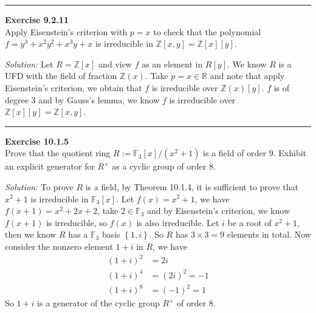 \documentclass[a4paper, 12pt]{article}
\newenvironment{problem}[2][Exercise]
    { \begin{mdframed}[backgroundcolor=gray!20] \textbf{#1 #2} \\}
    {  \end{mdframed}}
\newenvironment{solution}
    {\textit{Solution:}}
    {}
\begin{document}
\noindent\rule{7in}{2.8pt}
\begin{problem}{9.2.11}
Apply Eisenstein's criterion with \(p=x\) to check that the polynomial \(f=y^3+x^2y^2+x^3y+x\) is irreducible in \(\mathbb{Z}[x,y]=\mathbb{Z}[x][y]\).
\end{problem}
\begin{solution}
Let \(R=\mathbb{Z}[x]\) and view \(f\) as an element in \(R[y]\). We know \(R\) is a UFD with the field of fraction \(\mathbb{Z}(x)\). Take \(p=x\in \mathbb{R}\) and note that 
apply Eisenstein's criterion, we obtain that \(f\) is irreducible over \(\mathbb{Z}(x)[y]\). \(f\) is of degree 3 and by Gauss's lemma, we know \(f\) is irreducible over \(\mathbb{Z}[x][y]=\mathbb{Z}[x,y]\).
\end{solution}

\noindent\rule{7in}{2.8pt}
\begin{problem}{10.1.5}
Prove that the quotient ring \(R:=\mathbb{F}_3[x]/(x^2+1)\) is a field of order \(9\). Exhibit an explicit generator for \(R^\times\) as a cyclic group of order \(8\).
\end{problem}
\begin{solution}
To prove \(R\) is a field, by Theorem 10.1.4, it is sufficient to prove that \(x^2+1\) is irreducible in \(\mathbb{F}_3[x]\). Let \(f(x)=x^2+1\), we have 
\(f(x+1)=x^2+2x+2\), take \(2\in \mathbb{F}_3\) and by Eisenstein's criterion, we know \(f(x+1)\) is irreducible, so \(f(x)\) is also irreducible. Let \(i\) be a root of \(x^2+1\), then we know \(R\) has a 
\(\mathbb{F}_3\) basis \(\left\{ 1,i \right\}\). So \(R\) has \(3\times 3=9\) elements in total. Now consider the nonzero element \(1+i\) in \(R\), we have 
\begin{align*}
	(1+i)^2&=2i\\ 
	(1+i)^4&=(2i)^2=-1\\ 
	(1+i)^8&=(-1)^2=1
\end{align*}
So \(1+i\) is a generator of the cyclic group \(R^\times \) of order \(8\).
\end{solution}
\end{document}
